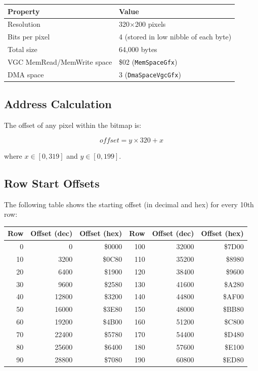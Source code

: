 \begin{center}
\small
\begin{tabular}{@{}ll@{}}
\toprule
\textbf{Property}         & \textbf{Value} \\
\midrule
Resolution                 & 320$\times$200 pixels \\
Bits per pixel             & 4 (stored in low nibble of each byte) \\
Total size                 & 64,000 bytes \\
VGC MemRead/MemWrite space & \$02 (\texttt{MemSpaceGfx}) \\
DMA space                  & 3 (\texttt{DmaSpaceVgcGfx}) \\
\bottomrule
\end{tabular}
\end{center}

\subsection{Address Calculation}

The offset of any pixel within the bitmap is:

\[
  \textit{offset} = y \times 320 + x
\]

where $x \in [0, 319]$ and $y \in [0, 199]$.

\subsection{Row Start Offsets}

The following table shows the starting offset (in decimal and hex) for every
10th row:

\begin{center}
\small
\begin{tabular}{@{}rrr@{\qquad}rrr@{}}
\toprule
\textbf{Row} & \textbf{Offset (dec)} & \textbf{Offset (hex)} &
\textbf{Row} & \textbf{Offset (dec)} & \textbf{Offset (hex)} \\
\midrule
  0 &     0 & \$0000 &  100 & 32000 & \$7D00 \\
 10 &  3200 & \$0C80 &  110 & 35200 & \$8980 \\
 20 &  6400 & \$1900 &  120 & 38400 & \$9600 \\
 30 &  9600 & \$2580 &  130 & 41600 & \$A280 \\
 40 & 12800 & \$3200 &  140 & 44800 & \$AF00 \\
 50 & 16000 & \$3E80 &  150 & 48000 & \$BB80 \\
 60 & 19200 & \$4B00 &  160 & 51200 & \$C800 \\
 70 & 22400 & \$5780 &  170 & 54400 & \$D480 \\
 80 & 25600 & \$6400 &  180 & 57600 & \$E100 \\
 90 & 28800 & \$7080 &  190 & 60800 & \$ED80 \\
\bottomrule
\end{tabular}
\end{center}

